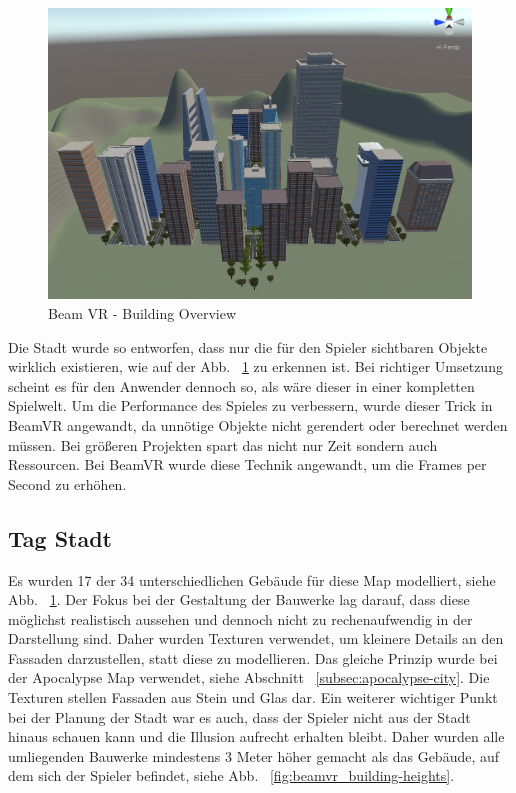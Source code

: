 \begin {figure}
    \centering
    \includegraphics[scale=0.18]{pics/beamvr_building-variety}
    \caption{Beam VR - Building Overview}
    \label{fig:beamvr_building-variety}
\end {figure}

Die Stadt wurde so entworfen, dass nur die für den Spieler sichtbaren Objekte wirklich existieren, wie auf der Abb. ~\ref{fig:beamvr_building-variety} zu erkennen ist.
Bei richtiger Umsetzung scheint es für den Anwender dennoch so, als w\"are dieser in einer kompletten Spielwelt.
Um die Performance des Spieles zu verbessern, wurde dieser Trick in BeamVR angewandt, da unn\"otige Objekte nicht gerendert oder berechnet werden m\"ussen.
Bei gr\"oßeren Projekten spart das nicht nur Zeit sondern auch Ressourcen.
Bei BeamVR wurde diese Technik angewandt, um die Frames per Second zu erh\"ohen.

\subsection{Tag Stadt}\label{subsec:day-city}
Es wurden 17 der 34 unterschiedlichen Geb\"aude f\"ur diese Map modelliert, siehe Abb. ~\ref{fig:beamvr_building-variety}.
Der Fokus bei der Gestaltung der Bauwerke lag darauf, dass diese m\"oglichst realistisch aussehen und dennoch nicht zu rechenaufwendig in der Darstellung sind.
Daher wurden Texturen verwendet, um kleinere Details an den Fassaden darzustellen, statt diese zu modellieren.
Das gleiche Prinzip wurde bei der Apocalypse Map verwendet, siehe Abschnitt ~\ref{subsec:apocalypse-city}.
Die Texturen stellen Fassaden aus Stein und Glas dar.
Ein weiterer wichtiger Punkt bei der Planung der Stadt war es auch, dass der Spieler nicht aus der Stadt hinaus schauen kann und die Illusion aufrecht erhalten bleibt.
Daher wurden alle umliegenden Bauwerke mindestens 3 Meter h\"oher gemacht als das Geb\"aude, auf dem sich der Spieler befindet, siehe Abb. ~\ref{fig:beamvr_building-heights}.

